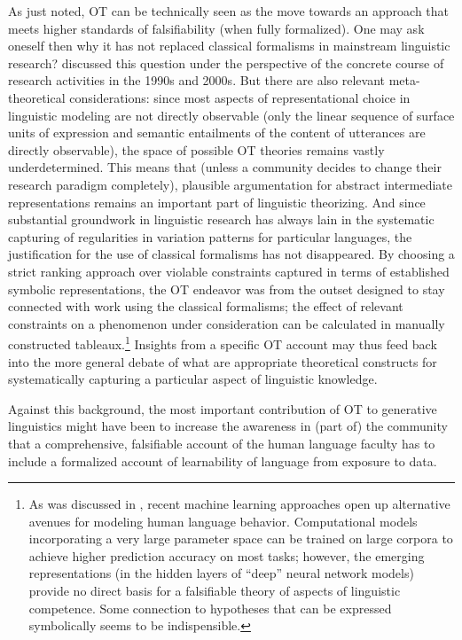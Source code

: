 \documentclass[output=paper,hidelinks]{langscibook}
\begin{document}
As just noted, OT can be technically seen as the move towards an approach that meets higher standards of falsifiability (when fully formalized). One may ask oneself then why it has not replaced classical formalisms in mainstream linguistic research?   discussed this question under the perspective of the concrete course of research activities in the 1990s and 2000s. But there are also relevant meta-theoretical considerations: since most aspects of representational choice in linguistic modeling are not directly observable (only the linear sequence of surface units of expression and semantic entailments of the content of utterances are directly observable), the space of possible OT theories remains vastly underdetermined. This means that (unless a community decides to change their research paradigm completely), plausible argumentation for abstract intermediate representations remains an important part of linguistic theorizing.  And since substantial groundwork in linguistic research has always lain in the systematic capturing of regularities in variation patterns for particular languages, the justification for the use of classical formalisms has not disappeared.  By choosing a strict ranking approach over violable constraints captured in terms of established symbolic representations, the OT endeavor was from the outset designed to stay connected with work using the classical formalisms; the effect of relevant constraints on a phenomenon under consideration can be calculated in manually constructed tableaux.\footnote{As was discussed in , recent machine learning approaches open up alternative avenues for modeling human language behavior. Computational models incorporating a very large parameter space can be trained on large corpora to achieve higher prediction accuracy on most tasks; however, the emerging representations (in the hidden layers of ``deep'' neural network models) provide no direct basis for a falsifiable theory of aspects of linguistic competence. Some connection to hypotheses that can be expressed symbolically seems to be indispensible.}  Insights from a specific OT account may thus feed back into the more general debate of what are appropriate theoretical constructs for systematically capturing a  particular aspect of linguistic knowledge.

Against this background, the most important contribution of OT to generative linguistics might have been to increase the awareness in (part of) the community that a comprehensive, falsifiable account of the human language faculty has to include a formalized account of learnability of language from exposure to data. 

\sloppy
\printbibliography[heading=subbibliography,notkeyword=this]
\end{document}
